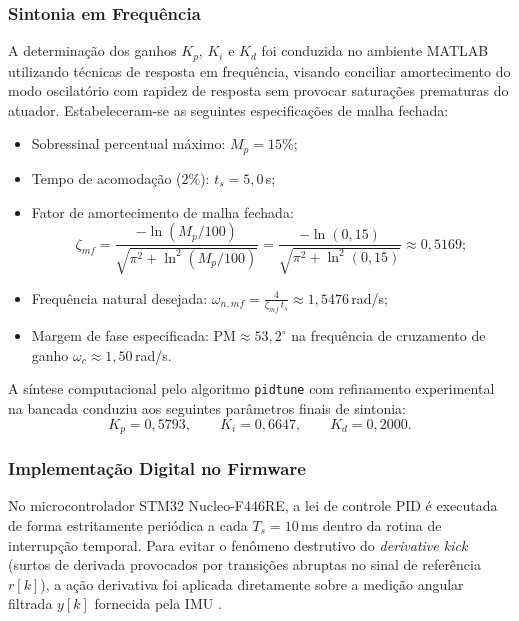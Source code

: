 \subsubsection{Sintonia em Frequência}

A determinação dos ganhos $K_p$, $K_i$ e $K_d$ foi conduzida no ambiente MATLAB utilizando técnicas de resposta em frequência, visando conciliar amortecimento do modo oscilatório com rapidez de resposta sem provocar saturações prematuras do atuador. Estabeleceram-se as seguintes especificações de malha fechada:
\begin{itemize}
    \item Sobressinal percentual máximo: $M_p = 15\%$;
    \item Tempo de acomodação ($2\%$): $t_s = 5{,}0$\,s;
    \item Fator de amortecimento de malha fechada:
    \begin{equation}
        \zeta_{mf} = \frac{-\ln(M_p/100)}{\sqrt{\pi^2 + \ln^2(M_p/100)}} = \frac{-\ln(0{,}15)}{\sqrt{\pi^2 + \ln^2(0{,}15)}} \approx 0{,}5169;
    \end{equation}
    \item Frequência natural desejada: $\omega_{n,mf} = \frac{4}{\zeta_{mf}\,t_s} \approx 1{,}5476$\,rad/s;
    \item Margem de fase especificada: $\text{PM} \approx 53{,}2^\circ$ na frequência de cruzamento de ganho $\omega_c \approx 1{,}50$\,rad/s.
\end{itemize}

A síntese computacional pelo algoritmo \texttt{pidtune} com refinamento experimental na bancada conduziu aos seguintes parâmetros finais de sintonia:
\begin{equation}
    K_p = 0{,}5793, \qquad K_i = 0{,}6647, \qquad K_d = 0{,}2000.
    \label{eq:ganhos_pid}
\end{equation}

\subsubsection{Implementação Digital no Firmware}

No microcontrolador STM32 Nucleo-F446RE, a lei de controle PID é executada de forma estritamente periódica a cada $T_s = 10$\,ms dentro da rotina de interrupção temporal. Para evitar o fenômeno destrutivo do \textit{derivative kick} (surtos de derivada provocados por transições abruptas no sinal de referência $r[k]$), a ação derivativa foi aplicada diretamente sobre a medição angular filtrada $y[k]$ fornecida pela IMU \cite{astrom1995}.

